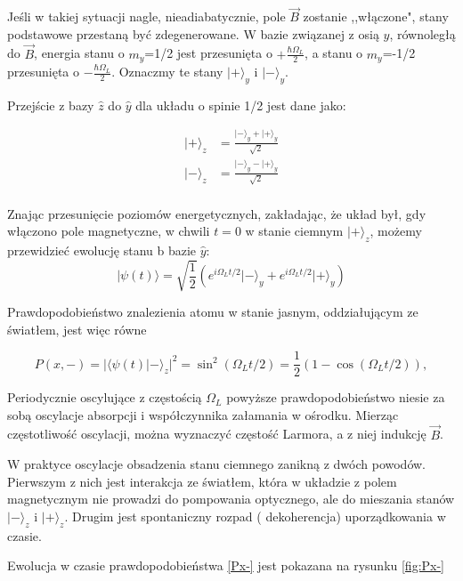 \documentclass[a4paper,10pt,twoside]{article}
\begin{document}
Jeśli w takiej sytuacji nagle, nieadiabatycznie, pole $\vec B$ zostanie ,,włączone", stany podstawowe przestaną być zdegenerowane. W bazie związanej z osią $\hat y$, równoległą do $\vec B$, energia stanu o $m_y$=1/2 jest przesunięta o $+\frac{\hbar \Omega_L}{2}$, a stanu o $m_y$=-1/2 przesunięta o $-\frac{\hbar \Omega_L}{2}$. Oznaczmy te stany $\lvert + \rangle_y$ i $\lvert - \rangle_y$.

Przejście z bazy $\hat z$ do $\hat y$ dla układu o spinie 1/2 jest dane jako:

\begin{align}
\lvert + \rangle_z &=\frac{\lvert - \rangle_y + \lvert + \rangle_y}{\sqrt{2}}\\
\lvert - \rangle_z &=\frac{\lvert - \rangle_y - \lvert + \rangle_y}{\sqrt{2}}\\
\end{align}

Znając przesunięcie poziomów energetycznych, zakładając, że układ był, gdy włączono pole magnetyczne, w chwili $t=0$ w stanie ciemnym $\lvert + \rangle_z$, możemy przewidzieć ewolucję stanu b bazie $\hat y$:
\begin{equation}
\lvert \psi(t) \rangle = \sqrt{\frac{1}{2}} \left( e^{i \Omega_L t/2} \lvert - \rangle_y + e^{i \Omega_L t/2} \lvert + \rangle_y \right)
\end{equation} 
 
Prawdopodobieństwo znalezienia atomu w stanie jasnym, oddziałującym ze światłem, jest więc równe

 \begin{equation}
P \left( x,- \right)= \lvert \langle \psi(t) \lvert - \rangle_z \rvert^2 = \sin^2 (\Omega_L t/2)= \frac{1}{2}\left(1-\cos(\Omega_L t/2) \right),
\label{Px-} 
\end{equation} 

Periodycznie oscylujące z częstością $\Omega_L$ powyższe prawdopodobieństwo niesie za sobą oscylacje absorpcji i współczynnika załamania w ośrodku. Mierząc częstotliwość oscylacji, można wyznaczyć częstość Larmora, a z niej indukcję $\vec B$.

W praktyce oscylacje obsadzenia stanu ciemnego zanikną z dwóch powodów. Pierwszym z nich jest interakcja ze światłem, która w układzie z polem magnetycznym nie prowadzi do pompowania optycznego, ale do mieszania stanów $\lvert - \rangle_z$ i $\lvert + \rangle_z$. Drugim jest spontaniczny rozpad ( dekoherencja) uporządkowania w czasie.

Ewolucja w czasie prawdopodobieństwa \ref{Px-} jest pokazana na rysunku \ref{fig:Px-}
\end{document}
